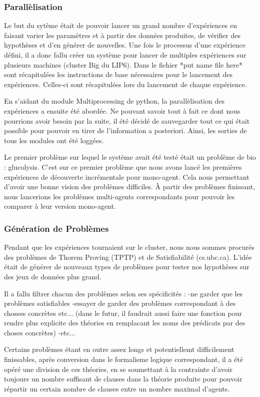 \documentclass{article}
\begin{document}
\subsubsection{Parallèlisation}
Le but du sytème était de pouvoir lancer un grand nombre d'expériences en faisant varier les paramètres et à partir des données produites, de vérifier des hypothèses et d'en générer de nouvelles. Une fois le processus d'une expérience défini, il a donc fallu créer un système pour lancer de multiples expériences sur plusieurs machines (cluster Big du LIP6). Dans le fichier *put name file here* sont récapitulées les instructions de base nécessaires pour le lancement des expériences. Celles-ci sont récapitulées lors du lancement de chaque expérience.

En s'aidant du module Multiprocessing de python, la parallèlisation des expériences a ensuite été abordée. Ne pouvant savoir tout à fait ce dont nous pourrions avoir besoin par la suite, il été décidé de sauvegarder tout ce qui était possible pour pouvoir en tirer de l'information a posteriori. Ainsi, les sorties de tous les modules ont été loggées.

Le premier problème sur lequel le système avait été testé était un problème de bio : glucolysis. C'est sur ce premier problème que nous avons lancé les premières expériences de découverte incrémentale pour mono-agent. Cela nous permettant d'avoir une bonne vision des problèmes difficiles. À partir des problèmes finissant, nous lancerions les problèmes multi-agents correspondants pour pouvoir les comparer à leur version mono-agent.


\subsubsection{Génération de Problèmes}
Pendant que les expériences tournaient sur le cluster, nous nous sommes procurés des problèmes de Thorem Proving (TPTP) et de Satisfiabilité (cs.ubc.ca).
L'idée était de générer de nouveaux types de problèmes pour tester nos hypothèses sur des jeux de données plus grand.

Il a fallu filtrer chacun des problèmes selon ses spécificités :
-ne garder que les problèmes satisfiables
-essayer de garder des problèmes correspondant à des chosses concrètes etc... (dans le futur, il faudrait aussi faire une fonction pour rendre plus explicite des théories en remplacant les noms des prédicats par des choses concrètes)
-etc...

Certains problèmes étant en outre assez longs et potentiellemt difficilement finissables,
après conversion dans le formalisme logique correspondant, il a été opéré une division de ces théories, en se soumettant à la contrainte d'avoir toujours un nombre suffisant de clauses dans la théorie produite pour pouvoir répartir un certain nombre de clauses entre un nombre maximal d'agents.
\end{document}
